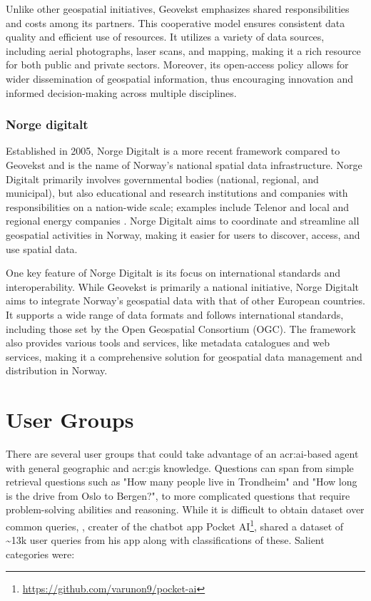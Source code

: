 Unlike other geospatial initiatives, Geovekst emphasizes shared responsibilities and costs among its partners. This cooperative model ensures consistent data quality and efficient use of resources. It utilizes a variety of data sources, including aerial photographs, laser scans, and mapping, making it a rich resource for both public and private sectors. Moreover, its open-access policy allows for wider dissemination of geospatial information, thus encouraging innovation and informed decision-making across multiple disciplines.

\subsubsection{Norge digitalt}\label{subsubsec:norge-digitalt}

Established in 2005, Norge Digitalt is a more recent framework compared to Geovekst and is the name of Norway's national spatial data infrastructure. Norge Digitalt primarily involves governmental bodies (national, regional, and municipal), but also educational and research institutions and companies with responsibilities on a nation-wide scale; examples include Telenor and local and regional energy companies \citep[6]{norgedigitaltGenerelleVilkarNorge2023}. Norge Digitalt aims to coordinate and streamline all geospatial activities in Norway, making it easier for users to discover, access, and use spatial data.

One key feature of Norge Digitalt is its focus on international standards and interoperability. While Geovekst is primarily a national initiative, Norge Digitalt aims to integrate Norway's geospatial data with that of other European countries. It supports a wide range of data formats and follows international standards, including those set by the Open Geospatial Consortium (OGC). The framework also provides various tools and services, like metadata catalogues and web services, making it a comprehensive solution for geospatial data management and distribution in Norway.

\section{User Groups}\label{sec:user-groups}

There are several user groups that could take advantage of an \acrshort{acr:ai}-based agent with general geographic and \acrshort{acr:gis} knowledge. Questions can span from simple retrieval questions such as "How many people live in Trondheim" and "How long is the drive from Oslo to Bergen?", to more complicated questions that require problem-solving abilities and reasoning. While it is difficult to obtain dataset over common queries, \cite{kumarWhatArePeople2023a}, creater of the chatbot app Pocket AI\footnote{\url{https://github.com/varunon9/pocket-ai}}, shared a dataset of \textasciitilde 13k user queries from his app along with classifications of these. Salient categories were:

